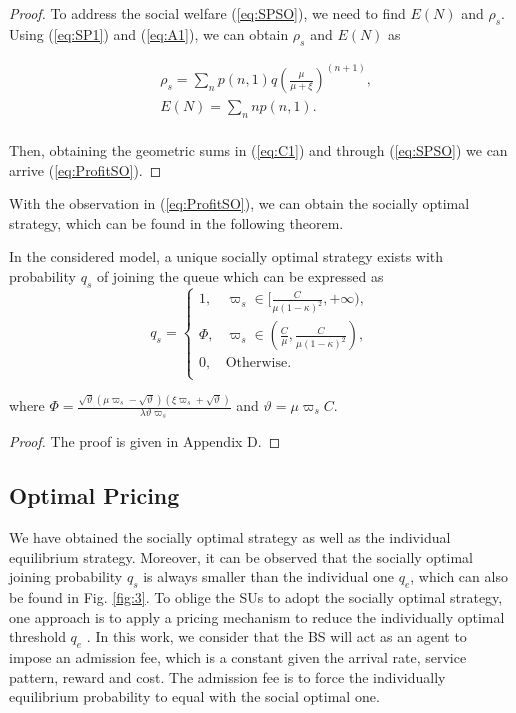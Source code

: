 \documentclass[journal]{IEEEtran}
\begin{document}
\begin{proof}
To address the social welfare (\ref{eq:SPSO}), we need to find
$E(N)$ and $\rho_s$. Using (\ref{eq:SP1}) and (\ref{eq:A1}), we
can obtain $\rho_s$ and $E(N)$ as

\begin{equation}
\begin{split}
\label{eq:C1} &\rho_s  = \sum_n p(n,1) q \left(\frac{\mu}{\mu +
\xi}\right)^{(n+1)}, \\
& E(N)  = \sum_n n p(n,1). \\
\end{split}
\end{equation}

Then, obtaining the geometric sums in (\ref{eq:C1}) and through
(\ref{eq:SPSO}) we can arrive (\ref{eq:ProfitSO}).
\end{proof}

With the observation in (\ref{eq:ProfitSO}), we can obtain the
socially optimal strategy, which can be found in the following
theorem.


\begin{theorem}
In the considered model, a unique socially optimal strategy exists
with probability $q_{s}$ of joining the queue which can be
expressed as
\begin{equation}
\label{eq:SOeq}
 q_{s}=
\begin{cases}
1, & \varpi_s \in [\frac{C}{\mu(1-\kappa )^2},+\infty), \\
\Phi, &\varpi_s \in (\frac{C}{\mu},\frac{C}{\mu(1-\kappa)^2}),\\
0, &\text{Otherwise.}\\
\end{cases}
\end{equation}

\noindent where $\Phi = \frac{\sqrt{\vartheta}(\mu \varpi_s -
\sqrt{\vartheta})(\xi \varpi_s + \sqrt{\vartheta})}{\lambda
\vartheta \varpi_s}$ and $\vartheta = \mu \varpi_s C$.

\end{theorem}
\begin{proof}
The proof is given in Appendix D.
\end{proof}


\subsection{Optimal Pricing}

We have obtained the socially optimal strategy as well as the
individual equilibrium strategy. Moreover, it can be observed that
the socially optimal joining probability $q_s$ is always smaller
than the individual one $q_e$, which can also be found in Fig. \ref{fig:3}. To oblige the SUs to adopt the
socially optimal strategy, one approach is to apply a pricing
mechanism to reduce the individually optimal threshold $q_e$
\cite{HLi}. In this work, we consider that the BS will act as an
agent to impose an admission fee, which is a constant given the
arrival rate, service pattern, reward and cost. The admission fee
is to force the individually equilibrium probability to equal with
the social optimal one. \par
\end{document}
